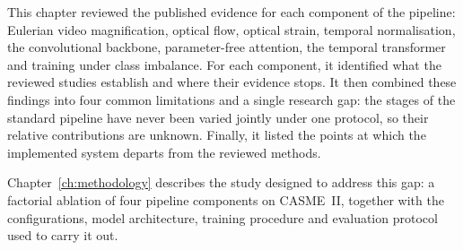 This chapter reviewed the published evidence for each component of the pipeline: Eulerian video magnification, optical flow, optical strain, temporal normalisation, the convolutional backbone, parameter-free attention, the temporal transformer and training under class imbalance. For each component, it identified what the reviewed studies establish and where their evidence stops. It then combined these findings into four common limitations and a single research gap: the stages of the standard pipeline have never been varied jointly under one protocol, so their relative contributions are unknown. Finally, it listed the points at which the implemented system departs from the reviewed methods.

Chapter~\ref{ch:methodology} describes the study designed to address this gap: a factorial ablation of four pipeline components on CASME~II, together with the configurations, model architecture, training procedure and evaluation protocol used to carry it out.
